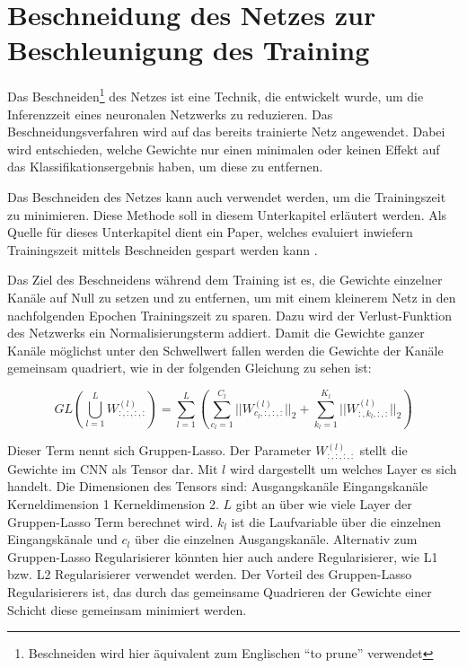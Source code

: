\section{Beschneidung des Netzes zur Beschleunigung des Training}
Das Beschneiden\footnote{Beschneiden wird hier äquivalent zum Englischen  "`to prune"' verwendet} des Netzes ist eine Technik, die entwickelt wurde, um die Inferenzzeit eines neuronalen Netzwerks zu reduzieren. Das Beschneidungsverfahren wird auf das bereits trainierte Netz angewendet. Dabei wird entschieden, welche Gewichte nur einen minimalen oder keinen Effekt auf das Klassifikationsergebnis haben, um diese zu entfernen.

Das Beschneiden des Netzes kann auch verwendet werden, um die Trainingszeit zu minimieren. Diese Methode soll in diesem Unterkapitel erläutert werden. Als Quelle für dieses Unterkapitel dient ein Paper, welches evaluiert inwiefern Trainingszeit mittels Beschneiden gespart werden kann \cite{prunetrain}.


Das Ziel des Beschneidens während dem Training ist es, die Gewichte einzelner Kanäle auf Null zu setzen und zu entfernen, um mit einem kleinerem Netz in den nachfolgenden Epochen Trainingszeit zu sparen. Dazu wird der Verlust-Funktion des Netzwerks ein Normalisierungsterm addiert. Damit die Gewichte ganzer Kanäle möglichst unter den Schwellwert fallen werden die Gewichte der Kanäle gemeinsam quadriert, wie in der folgenden Gleichung zu sehen ist:

\begin{equation}
GL(\bigcup_{l=1}^{L} W_{:,:,:,:}^{(l)})=\sum_{l=1}^{L} \left( \sum_{c_l=1}^{C_l} || W_{c_l,:,:,:}^{(l)} ||_2 + \sum_{k_l=1}^{K_l} || W_{:,k_l,:,:}^{(l)}||_2 \right)
 \label{equ:PTloss}
\end{equation}

Dieser Term nennt sich Gruppen-Lasso. Der Parameter $W_{:,:,:,:}^{(l)}$ stellt die Gewichte im CNN als Tensor dar. Mit $l$ wird dargestellt um welches Layer es sich handelt. Die Dimensionen des Tensors sind: Ausgangskanäle \texttimes Eingangskanäle \texttimes Kerneldimension 1 \texttimes Kerneldimension 2. $L$ gibt an über wie viele Layer der Gruppen-Lasso Term berechnet wird. $k_l$ ist die Laufvariable über die einzelnen Eingangskänale und $c_l$ über die einzelnen Ausgangskanäle. Alternativ zum Gruppen-Lasso Regularisierer könnten hier auch andere Regularisierer, wie L1 bzw. L2 Regularisierer verwendet werden. Der Vorteil des Gruppen-Lasso Regularisierers ist, das durch das gemeinsame Quadrieren der Gewichte einer Schicht diese gemeinsam minimiert werden.


